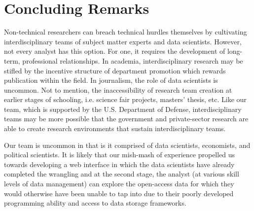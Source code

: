 \documentclass[preprint,authoryear,12pt]{elsarticle/elsarticle}
\begin{document}
\section{Concluding Remarks}
\label{sec:conclusion}
Non-technical researchers can breach technical hurdles themselves by cultivating interdisciplinary teams of subject matter experts and data scientists. However, not every analyst has this option. For one, it requires the development of long-term, professional relationships. In academia, interdisciplinary research may be stifled by the incentive structure of department promotion which rewards publication within the field. In journalism, the role of data scientists is uncommon. Not to mention, the inaccessibility of research team creation at earlier stages of schooling, i.e. science fair projects, masters’ thesis, etc. Like our team, which is supported by the U.S. Department of Defense, interdisciplinary teams may be more possible that the government and private-sector research are able to create research environments that sustain interdisciplinary teams.

Our team is uncommon in that is it comprised of data scientists, economists, and political scientists. It is likely that our mish-mash of experience propelled us towards developing a web interface in which the data scientists have already completed the wrangling and at the second stage, the analyst (at various skill levels of data management) can explore the open-access data for which they would otherwise have been unable to tap into due to their poorly developed programming ability and access to data storage frameworks. 



\end{document}
